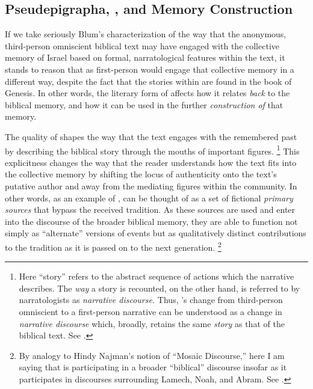 \subsection{Pseudepigrapha, \ga, and Memory Construction}

If we take seriously Blum's characterization of the way that the anonymous, third-person omniscient biblical text may have engaged with the collective memory of Israel based on formal, narratological features within the text, it stands to reason that \ga as first-person \psy would engage that collective memory in a different way, despite the fact that the stories within \ga are found in the book of Genesis. In other words, the literary form of \ga affects how it relates \emph{back} to the biblical memory, and how it can be used in the further \emph{construction of} that memory.

The \psgraphic quality of \ga shapes the way that the text engages with the remembered past by describing the biblical story through the mouths of important figures.%
    \footnote{Here ``story'' refers to the abstract sequence of actions which the narrative describes. The \emph{way} a story is recounted, on the other hand, is referred to by narratologists as \emph{narrative discourse.} Thus, \ga's change from third-person omniscient to a \psgraphical first-person narrative can be understood as a change in \emph{narrative discourse} which, broadly, retains the same \emph{story} as that of the biblical text. See \cite[13--27, esp. 18--19]{abbott2008}.}
This explicitness changes the way that the reader understands how the text fits into the collective memory by shifting the locus of authenticity onto the text's putative author and away from the mediating figures within the community. In other words, as an example of \psy, \ga can be thought of as a set of fictional \emph{primary sources} that bypass the received tradition. As these sources are used and enter into the discourse of the broader biblical memory, they are able to function not simply as ``alternate'' versions of events but as qualitatively distinct contributions to the tradition as it is passed on to the next generation.%
    \footnote{By analogy to Hindy Najman's notion of ``Mosaic Discourse,'' here I am saying that \ga is participating in a broader ``biblical'' discourse insofar as it participates in discourses surrounding Lamech, Noah, and Abram. See \cite[1--40]{najman2003}.}

